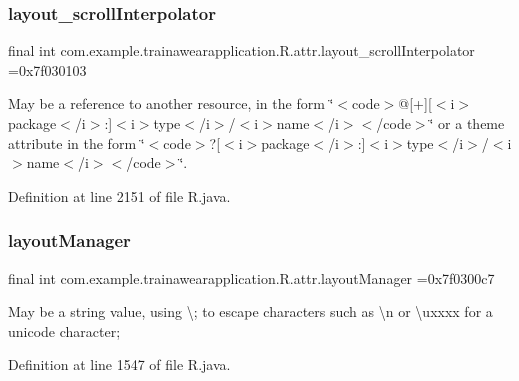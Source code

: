 \subsubsection{\texorpdfstring{layout\_scrollInterpolator}{layout\_scrollInterpolator}}
{\footnotesize\ttfamily final int com.\+example.\+trainawearapplication.\+R.\+attr.\+layout\+\_\+scroll\+Interpolator =0x7f030103\hspace{0.3cm}{\ttfamily [static]}}

May be a reference to another resource, in the form \char`\"{}$<$code$>$@\mbox{[}+\mbox{]}\mbox{[}$<$i$>$package$<$/i$>$\+:\mbox{]}$<$i$>$type$<$/i$>$/$<$i$>$name$<$/i$>$$<$/code$>$\char`\"{} or a theme attribute in the form \char`\"{}$<$code$>$?\mbox{[}$<$i$>$package$<$/i$>$\+:\mbox{]}$<$i$>$type$<$/i$>$/$<$i$>$name$<$/i$>$$<$/code$>$\char`\"{}. 

Definition at line 2151 of file R.\+java.

\mbox{\label{classcom_1_1example_1_1trainawearapplication_1_1_r_1_1attr_a3f8a3543713dc5f7f2fd48eb631c17e2}} 
\subsubsection{\texorpdfstring{layoutManager}{layoutManager}}
{\footnotesize\ttfamily final int com.\+example.\+trainawearapplication.\+R.\+attr.\+layout\+Manager =0x7f0300c7\hspace{0.3cm}{\ttfamily [static]}}

May be a string value, using \textquotesingle{}\textbackslash{};\textquotesingle{} to escape characters such as \textquotesingle{}\textbackslash{}n\textquotesingle{} or \textquotesingle{}\textbackslash{}uxxxx\textquotesingle{} for a unicode character; 

Definition at line 1547 of file R.\+java.

\mbox{\label{classcom_1_1example_1_1trainawearapplication_1_1_r_1_1attr_ab882a1b0a8a047b58a4e3b7ca2a4b4c6}} 
